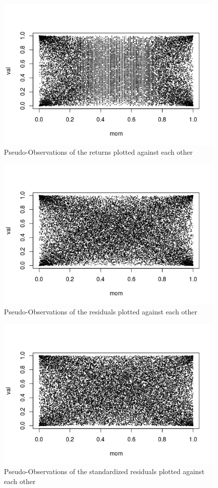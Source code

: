 \documentclass[12pt,letterpaper]{memoir}
\begin{document}
\begin{figure}
\includegraphics[scale=1]{obs}
\caption{Pseudo-Observations of the returns plotted against each other}
\end{figure}
\begin{figure}
\includegraphics[scale=1]{res}
\caption{Pseudo-Observations of the residuals plotted against each other}
\end{figure}
\begin{figure}
\includegraphics[scale=1]{stres}
\caption{Pseudo-Observations of the standardized residuals plotted against each other}
\end{figure}
\end{document}
